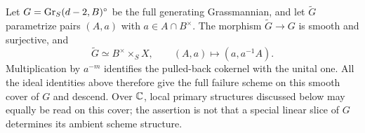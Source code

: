 \begin{remark}
\label{rem:codim-two-unit-cover}
Let $G=\operatorname{Gr}_S(d-2,B)^\circ$ be the full generating Grassmannian,
and let $\widetilde G$ parametrize pairs $(A,a)$ with $a\in A\cap B^\times$.
The morphism $\widetilde G\to G$ is smooth and surjective, and
\[
 \widetilde G\simeq B^\times\times_S X,
 \qquad (A,a)\longmapsto(a,a^{-1}A).
\]
Multiplication by $a^{-m}$ identifies the pulled-back cokernel with
the unital one. All the ideal identities above therefore give the
full failure scheme on this smooth cover of $G$ and descend.
Over $\mathbb C$, local primary structures discussed below may equally be
read on this cover; the assertion is not that a special linear
slice of $G$ determines its ambient scheme structure.
\end{remark}
